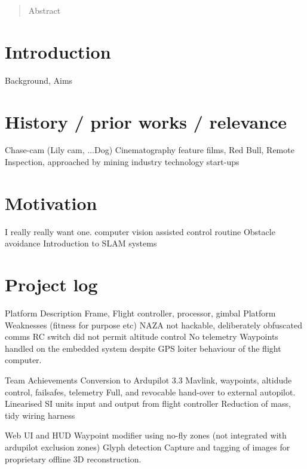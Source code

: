 \documentclass[a4paper, 11pt, titlepage]{article}
\begin{document}
  

  \begin{abstract}
Abstract

  \end{abstract}

  \tableofcontents

  \section{Introduction}
	Background, Aims

\section{History / prior works / relevance}
	Chase-cam (Lily cam, ...Dog)
	Cinematography	feature films, Red Bull, 
	Remote Inspection, approached by mining industry technology start-ups

\section{Motivation}
	I really really want one.
	computer vision assisted control routine
	Obstacle avoidance
	Introduction to SLAM systems

\section{Project log}

	Platform
		Description
			Frame, Flight controller, processor, gimbal
		Platform Weaknesses
			(fitness for purpose etc)
			NAZA not hackable, deliberately obfuscated comms
			RC switch did not permit altitude control
			No telemetry
			Waypoints handled on the embedded system despite GPS loiter behaviour of the flight computer.


	Team Achievements
		Conversion to Ardupilot 3.3
		Mavlink, waypoints, altidude control, failsafes, telemetry
		Full, and revocable hand-over to external autopilot.
		Linearised SI units input and output from flight controller
		Reduction of mass, tidy wiring harness
		
		Web UI and HUD
		Waypoint modifier using no-fly zones (not integrated with ardupilot exclusion zones)
		Glyph detection
		Capture and tagging of images for proprietary offline 3D reconstruction.
\end{document}
